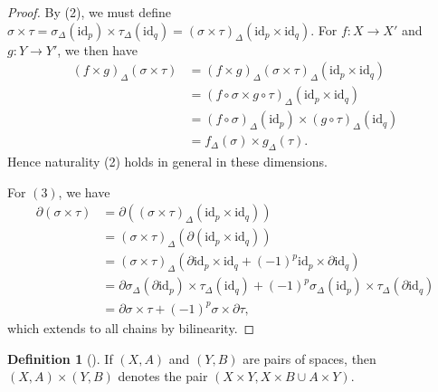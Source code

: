 \documentclass[reqno]{amsart}
\theoremstyle{definition}
\newtheorem{definition}[theorem]{Definition}
\theoremstyle{remark}
\newcommand{\id}{{\mathrm{id}}}
\begin{document}
\begin{proof}
    By (2), we must define
    $\sigma \times \tau = \sigma_{\Delta}(\id_p) \times 
    \tau_{\Delta}(\id_q) = 
    \left( \sigma \times \tau \right)_{\Delta}
    \left( \id_p \times \id_q \right) $.
    For $f \colon X \to X'$ and $g \colon Y \to Y'$, we 
    then have
    \begin{align*}
        (f \times g)_{\Delta}
        \left( \sigma \times \tau \right) 
        &= \left( f \times g \right)_{\Delta}
        \left( \sigma \times \tau \right)_{\Delta}
        \left( \id_p \times \id_q \right) 
        \\
        &= \left( f \circ \sigma \times g \circ \tau \right)_{\Delta}
        (\id_p \times \id_q)\\
        &= \left( f \circ \sigma \right)_{\Delta}(\id_p)
        \times \left( g \circ \tau \right)_{\Delta}
        (\id_q)\\
        &= f_{\Delta} (\sigma) \times 
        g_{\Delta}(\tau).
    \end{align*}
    Hence naturality (2) holds in general in these
    dimensions.

    For $(3)$, we have
    \begin{align*}
        \partial (\sigma \times \tau)
        &= \partial \left( \left( \sigma \times \tau \right)_{\Delta}
        \left( \id_p \times \id_q \right) \right) \\
        &= \left( \sigma \times \tau \right)_{\Delta}
        \left( \partial \left( \id_p \times \id_q \right)  \right) 
        \tag{Ch map commutes w $\partial$}\\
        &= \left( \sigma \times \tau \right)_{\Delta}
        \left( \partial \id_p \times \id_q +
        (-1)^{p} \id_p \times \partial \id_q \right) \\
        &= \partial \sigma_{\Delta}(\partial \id_p) \times 
        \tau_{\Delta}(\id_q) + (-1)^{p}
        \sigma_{\Delta}(\id_p) \times 
        \tau_{\Delta}\left( \partial \id_q \right) \\
        &= \partial \sigma \times \tau +
        (-1)^{p} \sigma \times \partial \tau,
    \end{align*}
    which extends to all chains by bilinearity.
\end{proof}

\begin{definition}[]
    If $(X,A)$ and $(Y,B)$ are pairs of spaces, then
    $(X ,A) \times (Y,B)$ denotes the pair
    $\left( X \times Y, 
    X \times B \cup  A \times Y\right) $.
\end{definition}
\end{document}
